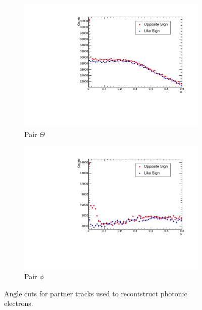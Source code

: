 \begin{figure}[htbp]
	\begin{center}
    \begin{subfigure}{0.65\textwidth}
        \includegraphics[width=\textwidth]{Plots/NPE/Theta_OS_LS.pdf}
        \caption{Pair $\Theta$}
        \label{fig:PE_Theta}
    \end{subfigure}
    \begin{subfigure}{0.65\textwidth}
        \includegraphics[width=\textwidth]{Plots/NPE/Phi_OS_LS.pdf}
        \caption{Pair $\phi$}
        \label{fig:PE_Phi}
    \end{subfigure}
	\end{center}
\caption[Angle Cuts for Phot. Electrons]{Angle cuts for partner tracks used to recontstruct photonic electrons.}
\label{fig:PE_angle}
\end{figure}

